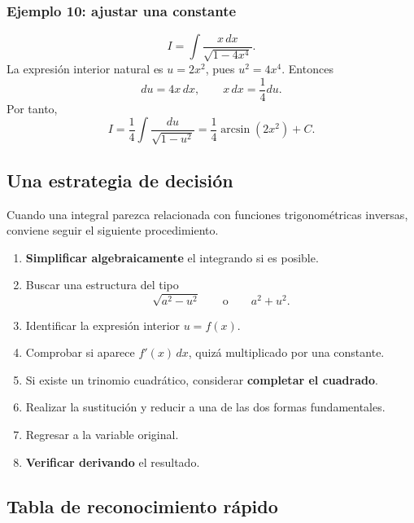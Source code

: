 \subsubsection*{Ejemplo 10: ajustar una constante}
\[
I=\int\frac{x\,dx}{\sqrt{1-4x^4}}.
\]
La expresión interior natural es $u=2x^2$, pues $u^2=4x^4$. Entonces
\[
du=4x\,dx,
\qquad x\,dx=\frac14du.
\]
Por tanto,
\[
I=\frac14\int\frac{du}{\sqrt{1-u^2}}
=\boxed{\frac14\arcsin(2x^2)+C}.
\]

\subsection{Una estrategia de decisión}

Cuando una integral parezca relacionada con funciones trigonométricas
inversas, conviene seguir el siguiente procedimiento.

\begin{enumerate}
\item \textbf{Simplificar algebraicamente} el integrando si es posible.
\item Buscar una estructura del tipo
\[
\sqrt{a^2-u^2}
\qquad\text{o}\qquad
a^2+u^2.
\]
\item Identificar la expresión interior $u=f(x)$.
\item Comprobar si aparece $f'(x)\,dx$, quizá multiplicado por una constante.
\item Si existe un trinomio cuadrático, considerar \textbf{completar el cuadrado}.
\item Realizar la sustitución y reducir a una de las dos formas fundamentales.
\item Regresar a la variable original.
\item \textbf{Verificar derivando} el resultado.
\end{enumerate}

\subsection{Tabla de reconocimiento rápido}

